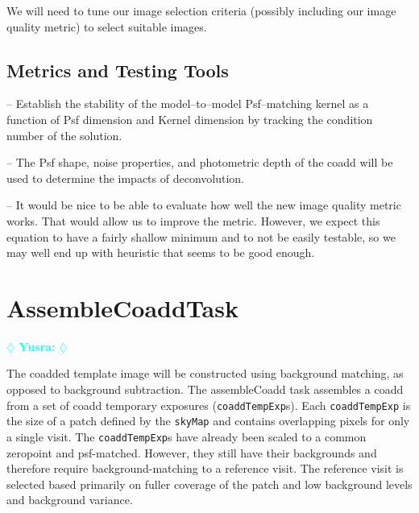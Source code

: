 \documentclass[12pt]{article}
\newcommand{\yusra} { \textcolor{cyan} {
\ensuremath{\diamondsuit} {\bf Yusra:}  
\ensuremath{\diamondsuit} } }
\begin{document}
We will need to tune our image selection criteria (possibly including our image quality metric)
to select suitable images.



\subsection{Metrics and Testing Tools}

-- Establish the stability of the model--to--model Psf--matching
kernel as a function of Psf dimension and Kernel dimension by tracking
the condition number of the solution.

-- The Psf shape, noise properties, and photometric depth of the coadd
will be used to determine the impacts of deconvolution.

-- It would be nice to be able to evaluate how well the new image quality metric
works. That would allow us to improve the metric. However, we expect this equation
to have a fairly shallow minimum and to not be easily testable, so we may well end up
with heuristic that seems to be good enough.


\clearpage 
\section{AssembleCoaddTask} \yusra

The coadded template image will be constructed using background
matching, as opposed to background subtraction. The assembleCoadd task assembles a coadd from a set of coadd temporary exposures ({\tt coaddTempExp}s).   Each {\tt coaddTempExp} is the size of a patch defined by the {\tt skyMap} and contains overlapping pixels for only a single visit.  The {\tt coaddTempExp}s have already been scaled to a common zeropoint and psf-matched.  However, they still have their backgrounds and therefore require background-matching to a reference visit. The reference visit is selected based primarily on fuller coverage of the patch and low background levels and background variance. 
\end{document}
